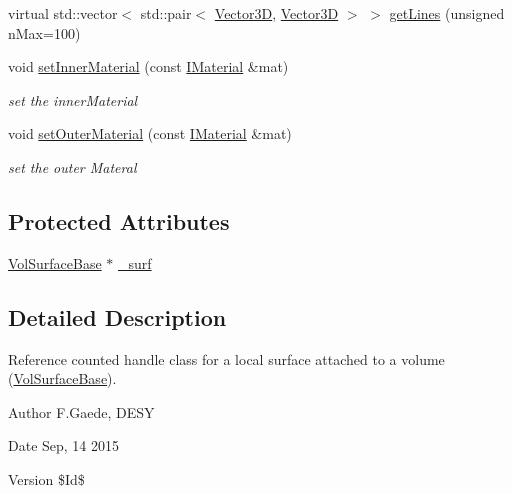 \begin{DoxyCompactItemize}
virtual std\+::vector$<$ std\+::pair$<$ \hyperlink{class_d_d_surfaces_1_1_vector3_d}{Vector3D}, \hyperlink{class_d_d_surfaces_1_1_vector3_d}{Vector3D} $>$ $>$ \hyperlink{class_d_d4hep_1_1_d_d_rec_1_1_vol_surface_a0800bcb853b43a688721247dd4031122}{get\+Lines} (unsigned n\+Max=100)
\item 
void \hyperlink{class_d_d4hep_1_1_d_d_rec_1_1_vol_surface_a17eba889b8f154c12db6c82dd6769845}{set\+Inner\+Material} (const \hyperlink{class_d_d_surfaces_1_1_i_material}{I\+Material} \&mat)
\begin{DoxyCompactList}\small\item\em set the inner\+Material \end{DoxyCompactList}\item 
void \hyperlink{class_d_d4hep_1_1_d_d_rec_1_1_vol_surface_af6a4ee6256e72d0b10e7ebfb54fc28da}{set\+Outer\+Material} (const \hyperlink{class_d_d_surfaces_1_1_i_material}{I\+Material} \&mat)
\begin{DoxyCompactList}\small\item\em set the outer Materal \end{DoxyCompactList}\end{DoxyCompactItemize}
\subsection*{Protected Attributes}
\begin{DoxyCompactItemize}
\item 
\hyperlink{class_d_d4hep_1_1_d_d_rec_1_1_vol_surface_base}{Vol\+Surface\+Base} $\ast$ \hyperlink{class_d_d4hep_1_1_d_d_rec_1_1_vol_surface_a434add1326a87d6d6e5ee0209777cd45}{\+\_\+surf}
\end{DoxyCompactItemize}


\subsection{Detailed Description}
Reference counted handle class for a local surface attached to a volume (\hyperlink{class_d_d4hep_1_1_d_d_rec_1_1_vol_surface_base}{Vol\+Surface\+Base}).

\begin{DoxyAuthor}{Author}
F.\+Gaede, D\+E\+SY 
\end{DoxyAuthor}
\begin{DoxyDate}{Date}
Sep, 14 2015 
\end{DoxyDate}
\begin{DoxyVersion}{Version}
\$\+Id\$ 
\end{DoxyVersion}


